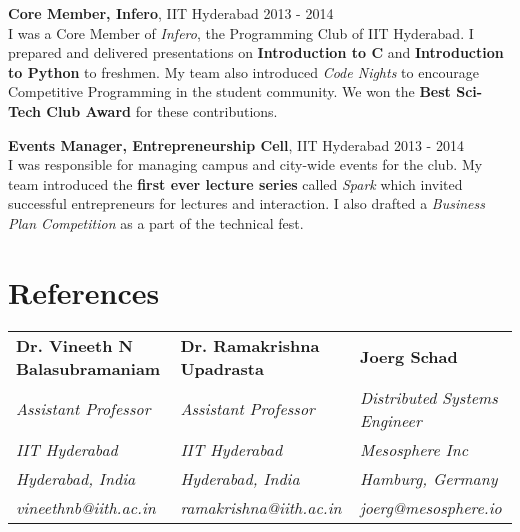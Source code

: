 \documentclass[margin,line]{res}
\begin{document}
\begin{resume}
  \vspace*{-2mm}
  {\bf Core Member, Infero}, IIT Hyderabad \hfill 2013 - 2014 \\
  	I was a Core Member of {\it Infero}, the Programming Club of IIT Hyderabad. I prepared and delivered presentations on {\bf Introduction to C} and {\bf Introduction to Python} to freshmen. My team also introduced {\it Code Nights} to encourage Competitive Programming in the student community. We won the {\bf Best Sci-Tech Club Award} for these contributions.

  \vspace*{-2mm}
  {\bf Events Manager, Entrepreneurship Cell}, IIT Hyderabad \hfill 2013 - 2014 \\
    I was responsible for managing campus and city-wide events for the club. My team introduced the {\bf first ever lecture series} called {\it Spark} which invited successful entrepreneurs for lectures and interaction. I also drafted a {\it Business Plan Competition} as a part of the technical fest.

\section{\sc References}

  \begin{tabular}{@{}p{1.85in}p{2in}p{2in}}

  {\bf Dr. Vineeth N \newline Balasubramaniam } & {\bf Dr. Ramakrishna \newline Upadrasta} & {\bf Joerg Schad} \\
        {\it Assistant Professor} & {\it Assistant Professor} & {\it Distributed Systems Engineer} \\
        {\it IIT Hyderabad} & {\it IIT Hyderabad} & {\it Mesosphere Inc} \\
        {\it Hyderabad, India} & {\it Hyderabad, India} & {\it Hamburg, Germany} \\
        {\it vineethnb@iith.ac.in} & {\it ramakrishna@iith.ac.in} & {\it joerg@mesosphere.io} \\

  \end{tabular}

\end{resume}
\end{document}
